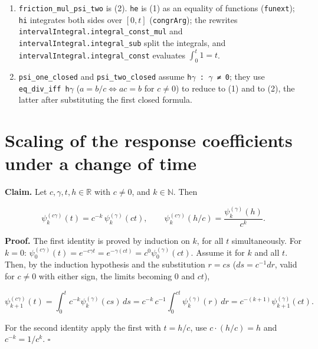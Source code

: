 \documentclass[11pt,a4paper]{article}
\begin{document}
\begin{leanbox}
\begin{enumerate}
\item \texttt{friction\_\allowbreak{}mul\_\allowbreak{}psi\_\allowbreak{}two} is (2). \texttt{he} is (1) as an equality of functions (\texttt{funext}); \texttt{hi} integrates both sides over \([0,t]\) (\texttt{congr\allowbreak{}Arg}); the rewrites \texttt{interval\allowbreak{}Integral.\allowbreak{}integral\_\allowbreak{}const\_\allowbreak{}mul} and \texttt{interval\allowbreak{}Integral.\allowbreak{}integral\_\allowbreak{}sub} split the integrals, and \texttt{interval\allowbreak{}Integral.\allowbreak{}integral\_\allowbreak{}const} evaluates \(\int_0^t1=t\).

\item \texttt{psi\_\allowbreak{}one\_\allowbreak{}closed} and \texttt{psi\_\allowbreak{}two\_\allowbreak{}closed} assume \texttt{h\ensuremath{\gamma} : \ensuremath{\gamma} ≠ 0}; they use \texttt{eq\_\allowbreak{}div\_\allowbreak{}iff h\ensuremath{\gamma}} (\(a=b/c\iff ac=b\) for \(c\neq0\)) to reduce to (1) and to (2), the latter after substituting the first closed formula.

\end{enumerate}
\end{leanbox}

\section{\texorpdfstring{Scaling of the response coefficients under a change of time}{Scaling of the response coefficients under a change of time}}


\textbf{Claim.} Let \(c,\gamma,t,h\in\mathbb R\) with \(c\neq0\), and \(k\in\mathbb N\). Then


\[\psi_k^{(c\gamma)}(t)=c^{-k}\,\psi_k^{(\gamma)}(ct),\qquad\psi_k^{(c\gamma)}(h/c)=\frac{\psi_k^{(\gamma)}(h)}{c^k}.\]


\textbf{Proof.} The first identity is proved by induction on \(k\), for all \(t\) simultaneously. For \(k=0\): \(\psi_0^{(c\gamma)}(t)=e^{-c\gamma t}=e^{-\gamma(ct)}=c^0\psi_0^{(\gamma)}(ct)\). Assume it for \(k\) and all \(t\). Then, by the induction hypothesis and the substitution \(r=cs\) (\(ds=c^{-1}dr\), valid for \(c\neq0\) with either sign, the limits becoming \(0\) and \(ct\)),


\[\psi_{k+1}^{(c\gamma)}(t)=\int_0^tc^{-k}\psi_k^{(\gamma)}(cs)\,ds=c^{-k}\,c^{-1}\int_0^{ct}\psi_k^{(\gamma)}(r)\,dr=c^{-(k+1)}\psi_{k+1}^{(\gamma)}(ct).\]


For the second identity apply the first with \(t=h/c\), use \(c\cdot(h/c)=h\) and \(c^{-k}=1/c^k\). \(\square\)
\end{document}
